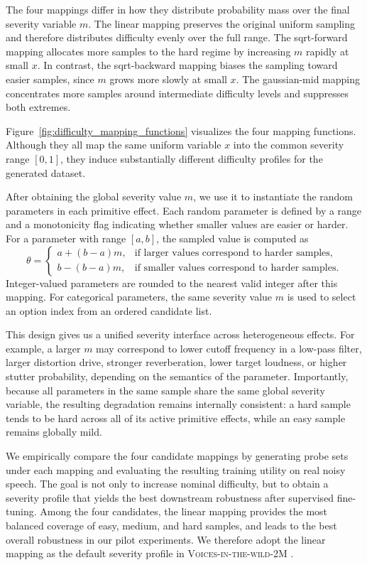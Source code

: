 \documentclass{article}
\begin{document}
The four mappings differ in how they distribute probability mass over the final
severity variable $m$. The linear mapping preserves the original uniform
sampling and therefore distributes difficulty evenly over the full range. The
sqrt-forward mapping allocates more samples to the hard regime by increasing
$m$ rapidly at small $x$. In contrast, the sqrt-backward mapping biases the
sampling toward easier samples, since $m$ grows more slowly at small $x$. The
gaussian-mid mapping concentrates more samples around intermediate difficulty
levels and suppresses both extremes.

Figure~\ref{fig:difficulty_mapping_functions} visualizes the four mapping
functions. Although they all map the same uniform variable $x$ into the common
severity range $[0,1]$, they induce substantially different difficulty profiles
for the generated dataset.

After obtaining the global severity value $m$, we use it to instantiate the
random parameters in each primitive effect. Each random parameter is defined by
a range and a monotonicity flag indicating whether smaller values are easier or
harder. For a parameter with range $[a,b]$, the sampled value is computed as
\[
\theta =
\begin{cases}
a + (b-a)m, & \text{if larger values correspond to harder samples},\\[3pt]
b - (b-a)m, & \text{if smaller values correspond to harder samples}.
\end{cases}
\]
Integer-valued parameters are rounded to the nearest valid integer after this
mapping. For categorical parameters, the same severity value $m$ is used to
select an option index from an ordered candidate list.

This design gives us a unified severity interface across heterogeneous effects.
For example, a larger $m$ may correspond to lower cutoff frequency in a
low-pass filter, larger distortion drive, stronger reverberation, lower target
loudness, or higher stutter probability, depending on the semantics of the
parameter. Importantly, because all parameters in the same sample share the same
global severity variable, the resulting degradation remains internally
consistent: a hard sample tends to be hard across all of its active primitive
effects, while an easy sample remains globally mild.

We empirically compare the four candidate mappings by generating probe sets
under each mapping and evaluating the resulting training utility on real noisy
speech. The goal is not only to increase nominal difficulty, but to obtain a
severity profile that yields the best downstream robustness after supervised
fine-tuning. Among the four candidates, the linear mapping provides the most
balanced coverage of easy, medium, and hard samples, and leads to the best
overall robustness in our pilot experiments. We therefore adopt the linear
mapping as the default severity profile in  \textsc{Voices-in-the-wild-2M} .
\end{document}
